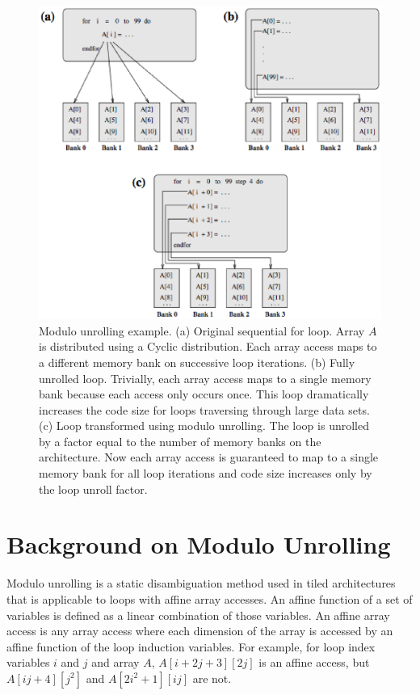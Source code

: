 \begin{figure}
\begin{center}
\includegraphics[scale=0.50]{./Figures/modulo_unrolling.eps}
\caption{Modulo unrolling example. (a) Original sequential for loop. Array $A$ is distributed using a Cyclic distribution. Each array access maps to a different memory bank on successive loop iterations. (b) Fully unrolled loop. Trivially, each array access maps to a single memory bank because each access only occurs once. This loop dramatically increases the code size for loops traversing through large data sets. (c) Loop transformed using modulo unrolling. The loop is unrolled by a factor equal to the number of memory banks on the architecture. Now each array access is guaranteed to map to a single memory bank for all loop iterations and code size increases only by the loop unroll factor.}
\label{modulo_unrolling}
\end{center}
\end{figure}

\section{Background on Modulo Unrolling}\label{sec:modulo_unrolling}

Modulo unrolling \cite{barua1999maps} is a static disambiguation method used in tiled architectures that is applicable to loops with affine array accesses. An affine function of a set of variables is defined as a linear combination of those variables. An affine array access is any array access where each dimension of the array is accessed by an affine function of the loop induction variables. For example, for loop index variables $i$ and $j$ and array $A$, $A[i+2j+3][2j]$ is an affine access, but $A[ij+4][j^2]$ and $A[2i^2+1][ij]$ are not. 

